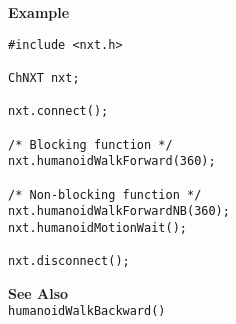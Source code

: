 \noindent
{\bf Example}
\begin{verbatim}
#include <nxt.h>

ChNXT nxt;

nxt.connect();

/* Blocking function */
nxt.humanoidWalkForward(360);

/* Non-blocking function */
nxt.humanoidWalkForwardNB(360);
nxt.humanoidMotionWait();

nxt.disconnect();
\end{verbatim}

\noindent
{\bf See Also}\\
\texttt{humanoidWalkBackward()}

